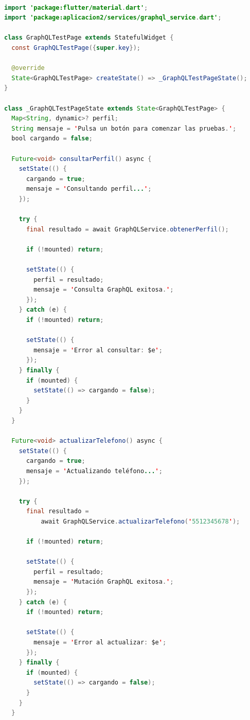 \begin{lstlisting}[language=Java, caption={graphql\_test\_page.dart}]

import 'package:flutter/material.dart';
import 'package:aplicacion2/services/graphql_service.dart';

class GraphQLTestPage extends StatefulWidget {
  const GraphQLTestPage({super.key});

  @override
  State<GraphQLTestPage> createState() => _GraphQLTestPageState();
}

class _GraphQLTestPageState extends State<GraphQLTestPage> {
  Map<String, dynamic>? perfil;
  String mensaje = 'Pulsa un botón para comenzar las pruebas.';
  bool cargando = false;

  Future<void> consultarPerfil() async {
    setState(() {
      cargando = true;
      mensaje = 'Consultando perfil...';
    });

    try {
      final resultado = await GraphQLService.obtenerPerfil();

      if (!mounted) return;

      setState(() {
        perfil = resultado;
        mensaje = 'Consulta GraphQL exitosa.';
      });
    } catch (e) {
      if (!mounted) return;

      setState(() {
        mensaje = 'Error al consultar: $e';
      });
    } finally {
      if (mounted) {
        setState(() => cargando = false);
      }
    }
  }

  Future<void> actualizarTelefono() async {
    setState(() {
      cargando = true;
      mensaje = 'Actualizando teléfono...';
    });

    try {
      final resultado =
          await GraphQLService.actualizarTelefono('5512345678');

      if (!mounted) return;

      setState(() {
        perfil = resultado;
        mensaje = 'Mutación GraphQL exitosa.';
      });
    } catch (e) {
      if (!mounted) return;

      setState(() {
        mensaje = 'Error al actualizar: $e';
      });
    } finally {
      if (mounted) {
        setState(() => cargando = false);
      }
    }
  }


\end{lstlisting}

